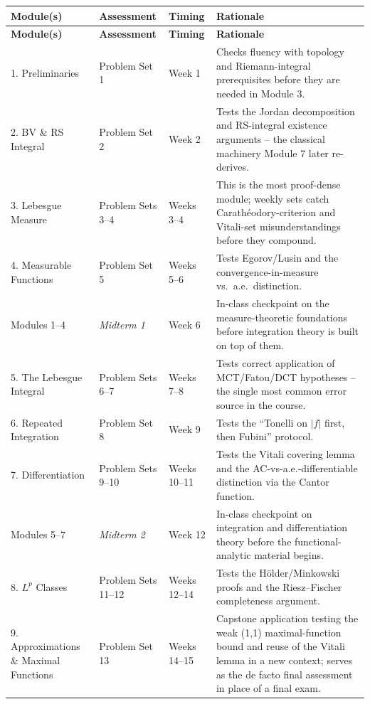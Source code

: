 \documentclass[11pt]{article}
\begin{document}
\begin{longtable}{@{}p{2.9cm} p{2.6cm} p{2.6cm} p{6.9cm}@{}}
\toprule
\textbf{Module(s)} & \textbf{Assessment} & \textbf{Timing} & \textbf{Rationale} \\
\midrule
\endfirsthead
\toprule
\textbf{Module(s)} & \textbf{Assessment} & \textbf{Timing} & \textbf{Rationale} \\
\midrule
\endhead
1. Preliminaries & Problem Set 1 & Week 1 & Checks fluency with topology and Riemann-integral prerequisites before they are needed in Module 3. \\
2. BV \& RS Integral & Problem Set 2 & Week 2 & Tests the Jordan decomposition and RS-integral existence arguments -- the classical machinery Module 7 later re-derives. \\
3. Lebesgue Measure & Problem Sets 3--4 & Weeks 3--4 & This is the most proof-dense module; weekly sets catch Carath\'eodory-criterion and Vitali-set misunderstandings before they compound. \\
4. Measurable Functions & Problem Set 5 & Weeks 5--6 & Tests Egorov/Lusin and the convergence-in-measure vs.\ a.e.\ distinction. \\
Modules 1--4 & \textit{Midterm 1} & Week 6 & In-class checkpoint on the measure-theoretic foundations before integration theory is built on top of them. \\
5. The Lebesgue Integral & Problem Sets 6--7 & Weeks 7--8 & Tests correct application of MCT/Fatou/DCT hypotheses -- the single most common error source in the course. \\
6. Repeated Integration & Problem Set 8 & Week 9 & Tests the ``Tonelli on $|f|$ first, then Fubini'' protocol. \\
7. Differentiation & Problem Sets 9--10 & Weeks 10--11 & Tests the Vitali covering lemma and the AC-vs-a.e.-differentiable distinction via the Cantor function. \\
Modules 5--7 & \textit{Midterm 2} & Week 12 & In-class checkpoint on integration and differentiation theory before the functional-analytic material begins. \\
8. $L^p$ Classes & Problem Sets 11--12 & Weeks 12--14 & Tests the H\"older/Minkowski proofs and the Riesz--Fischer completeness argument. \\
9. Approximations \& Maximal Functions & Problem Set 13 & Weeks 14--15 & Capstone application testing the weak (1,1) maximal-function bound and reuse of the Vitali lemma in a new context; serves as the de facto final assessment in place of a final exam. \\
\bottomrule
\end{longtable}
\end{document}
